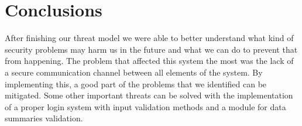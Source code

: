 \section{Conclusions}

After finishing our threat model we were able to better understand what kind of security problems may harm us in the future and what we can do to prevent that from happening. The problem that affected this system the most was the lack of a secure communication channel between all elements of the system. By implementing this, a good part of the problems that we identified can be mitigated. Some other important threats can be solved with the implementation of a proper login system with input validation methods and a module for data summaries validation.


\pagebreak